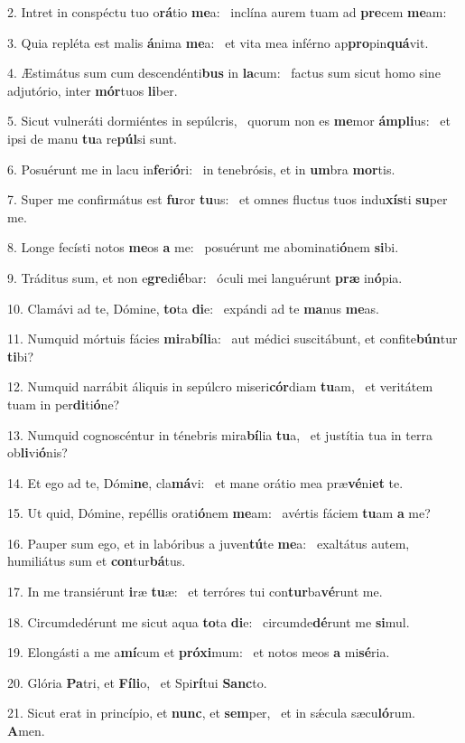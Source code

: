 2. Intret in conspéctu tuo o\textbf{rá}tio \textbf{me}a: \ast\  inclína aurem tuam ad \textbf{pre}cem \textbf{me}am:\

3. Quia repléta est malis \textbf{á}nima \textbf{me}a: \ast\  et vita mea inférno ap\textbf{pro}pin\textbf{quá}vit.\

4. Æstimátus sum cum descendénti\textbf{bus} in \textbf{la}cum: \ast\  factus sum sicut homo sine adjutório, inter \textbf{mór}tuos \textbf{li}ber.\

5. Sicut vulneráti dormiéntes in sepúlcris, \dag\  quorum non es \textbf{me}mor \textbf{ám}\textbf{pli}us: \ast\  et ipsi de manu \textbf{tu}a re\textbf{púl}si sunt.\

6. Posuérunt me in lacu in\textbf{fe}ri\textbf{ó}ri: \ast\  in tenebrósis, et in \textbf{um}bra \textbf{mor}tis.\

7. Super me confirmátus est \textbf{fu}ror \textbf{tu}us: \ast\  et omnes fluctus tuos indu\textbf{xís}ti \textbf{su}per me.\

8. Longe fecísti notos \textbf{me}os \textbf{a} me: \ast\  posuérunt me abominati\textbf{ó}nem \textbf{si}bi.\

9. Tráditus sum, et non e\textbf{gre}di\textbf{é}bar: \ast\  óculi mei languérunt \textbf{præ} in\textbf{ó}pia.\

10. Clamávi ad te, Dómine, \textbf{to}ta \textbf{di}e: \ast\  expándi ad te \textbf{ma}nus \textbf{me}as.\

11. Numquid mórtuis fácies \textbf{mi}ra\textbf{bí}\textbf{li}a: \ast\  aut médici suscitábunt, et confite\textbf{bún}tur \textbf{ti}bi?\

12. Numquid narrábit áliquis in sepúlcro miseri\textbf{cór}diam \textbf{tu}am, \ast\  et veritátem tuam in per\textbf{di}ti\textbf{ó}ne?\

13. Numquid cognoscéntur in ténebris mira\textbf{bí}lia \textbf{tu}a, \ast\  et justítia tua in terra ob\textbf{li}vi\textbf{ó}nis?\

14. Et ego ad te, Dómi\textbf{ne}, cla\textbf{má}vi: \ast\  et mane orátio mea præ\textbf{vé}ni\textbf{et} te.\

15. Ut quid, Dómine, repéllis orati\textbf{ó}nem \textbf{me}am: \ast\  avértis fáciem \textbf{tu}am \textbf{a} me?\

16. Pauper sum ego, et in labóribus a juven\textbf{tú}te \textbf{me}a: \ast\  exaltátus autem, humiliátus sum et \textbf{con}tur\textbf{bá}tus.\

17. In me transiérunt \textbf{i}ræ \textbf{tu}æ: \ast\  et terróres tui con\textbf{tur}ba\textbf{vé}runt me.\

18. Circumdedérunt me sicut aqua \textbf{to}ta \textbf{di}e: \ast\  circumde\textbf{dé}runt me \textbf{si}mul.\

19. Elongásti a me a\textbf{mí}cum et \textbf{pró}\textbf{xi}mum: \ast\  et notos meos \textbf{a} mi\textbf{sé}ria.\

20. Glória \textbf{Pa}tri, et \textbf{Fí}\textbf{li}o, \ast\  et Spi\textbf{rí}tui \textbf{Sanc}to.\

21. Sicut erat in princípio, et \textbf{nunc}, et \textbf{sem}per, \ast\  et in sǽcula sæcu\textbf{ló}rum. \textbf{A}men.\

